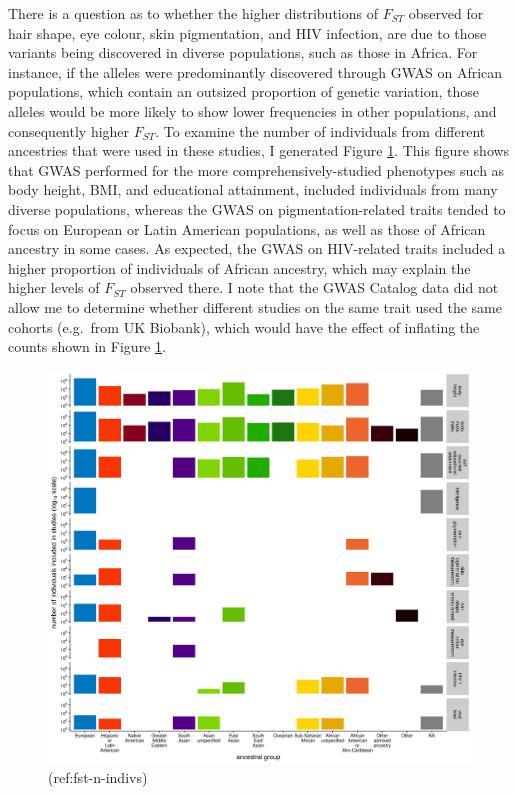 \documentclass[
]{book}
\begin{document}
There is a question as to whether the higher distributions of \(F_{ST}\) observed for hair shape, eye colour, skin pigmentation, and HIV infection, are due to those variants being discovered in diverse populations, such as those in Africa. For instance, if the alleles were predominantly discovered through GWAS on African populations, which contain an outsized proportion of genetic variation, those alleles would be more likely to show lower frequencies in other populations, and consequently higher \(F_{ST}\). To examine the number of individuals from different ancestries that were used in these studies, I generated Figure \ref{fig:fst-n-indivs}. This figure shows that GWAS performed for the more comprehensively-studied phenotypes such as body height, BMI, and educational attainment, included individuals from many diverse populations, whereas the GWAS on pigmentation-related traits tended to focus on European or Latin American populations, as well as those of African ancestry in some cases. As expected, the GWAS on HIV-related traits included a higher proportion of individuals of African ancestry, which may explain the higher levels of \(F_{ST}\) observed there. I note that the GWAS Catalog data did not allow me to determine whether different studies on the same trait used the same cohorts (e.g.~from UK Biobank), which would have the effect of inflating the counts shown in Figure \ref{fig:fst-n-indivs}.

\begin{figure}
\includegraphics[width=1\linewidth]{figs/fst/20220324_n_individuals} \caption{(ref:fst-n-indivs)}\label{fig:fst-n-indivs}
\end{figure}
\end{document}
